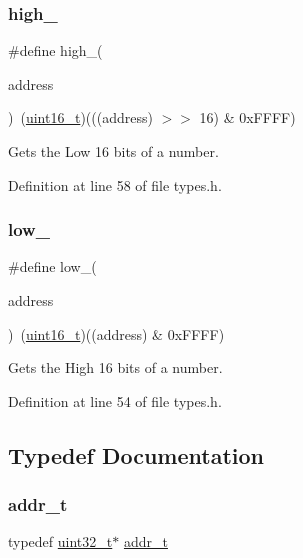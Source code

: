 \subsubsection{\texorpdfstring{high\+\_}{high\_16}}
{\footnotesize\ttfamily \#define high\+\_(\begin{DoxyParamCaption}\item[{}]{address }\end{DoxyParamCaption})~(\hyperlink{a00047_a273cf69d639a59973b6019625df33e30_a273cf69d639a59973b6019625df33e30}{uint16\+\_\+t})(((address) $>$$>$ 16) \& 0x\+F\+F\+F\+F)}



Gets the Low 16 bits of a number. 



Definition at line 58 of file types.\+h.

\mbox{\label{a00047_aded7ad58a4bedfffea10d5ae9c0c817e_aded7ad58a4bedfffea10d5ae9c0c817e}} 
\subsubsection{\texorpdfstring{low\+\_}{low\_16}}
{\footnotesize\ttfamily \#define low\+\_(\begin{DoxyParamCaption}\item[{}]{address }\end{DoxyParamCaption})~(\hyperlink{a00047_a273cf69d639a59973b6019625df33e30_a273cf69d639a59973b6019625df33e30}{uint16\+\_\+t})((address) \& 0x\+F\+F\+F\+F)}



Gets the High 16 bits of a number. 



Definition at line 54 of file types.\+h.



\subsection{Typedef Documentation}
\mbox{\label{a00047_a295f71165288684c38c6bb836fbb3c59_a295f71165288684c38c6bb836fbb3c59}} 
\subsubsection{\texorpdfstring{addr\+\_\+t}{addr\_t}}
{\footnotesize\ttfamily typedef \hyperlink{a00047_a435d1572bf3f880d55459d9805097f62_a435d1572bf3f880d55459d9805097f62}{uint32\+\_\+t}$\ast$ \hyperlink{a00047_a295f71165288684c38c6bb836fbb3c59_a295f71165288684c38c6bb836fbb3c59}{addr\+\_\+t}}



